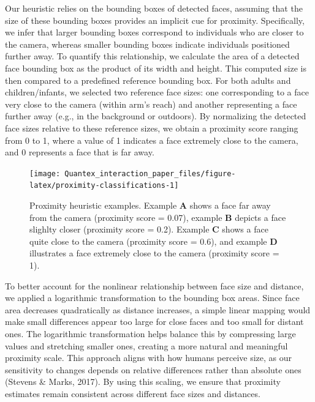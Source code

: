 \documentclass[
  man,floatsintext]{apa6}
\begin{document}
Our heuristic relies on the bounding boxes of detected faces, assuming that the size of these bounding boxes provides an implicit cue for proximity. Specifically, we infer that larger bounding boxes correspond to individuals who are closer to the camera, whereas smaller bounding boxes indicate individuals positioned further away. To quantify this relationship, we calculate the area of a detected face bounding box as the product of its width and height. This computed size is then compared to a predefined reference bounding box. For both adults and children/infants, we selected two reference face sizes: one corresponding to a face very close to the camera (within arm's reach) and another representing a face further away (e.g., in the background or outdoors). By normalizing the detected face sizes relative to these reference sizes, we obtain a proximity score ranging from 0 to 1, where a value of 1 indicates a face extremely close to the camera, and 0 represents a face that is far away.

\begin{figure}

{\centering \texttt{[image: Quantex\_interaction\_paper\_files/figure-latex/proximity-classifications-1]} 

}

\caption{Proximity heuristic examples. Example \textbf{A} shows a face far away from the camera (proximity score = 0.07), example \textbf{B} depicts a face slighlty closer (proximity score = 0.2). Example \textbf{C} shows a face quite close to the camera (proximity score = 0.6), and example \textbf{D} illustrates a face extremely close to the camera (proximity score = 1).}\label{fig:proximity-classifications}
\end{figure}

To better account for the nonlinear relationship between face size and distance, we applied a logarithmic transformation to the bounding box areas. Since face area decreases quadratically as distance increases, a simple linear mapping would make small differences appear too large for close faces and too small for distant ones. The logarithmic transformation helps balance this by compressing large values and stretching smaller ones, creating a more natural and meaningful proximity scale. This approach aligns with how humans perceive size, as our sensitivity to changes depends on relative differences rather than absolute ones (Stevens \& Marks, 2017). By using this scaling, we ensure that proximity estimates remain consistent across different face sizes and distances.
\end{document}
